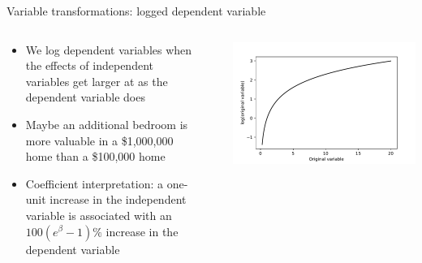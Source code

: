 \begin{frame}{Variable transformations: logged dependent variable}
  \begin{columns}
    \begin{column}{0.65\textwidth}
      \begin{itemize}
        \item We log dependent variables when the effects of independent variables get larger at as the dependent variable does
        \item Maybe an additional bedroom is more valuable in a \$1,000,000 home than a \$100,000 home
        \item Coefficient interpretation: a one-unit increase in the independent variable is associated with an $100(e^\beta - 1)\%$ increase in the dependent variable \autocite{ford_interpreting_2018}
      \end{itemize}
    \end{column}~%
    \begin{column}{0.34\textwidth}
      \includegraphics[width=\textwidth]{fig/log.pdf}
    \end{column}
  \end{columns}
\end{frame}


